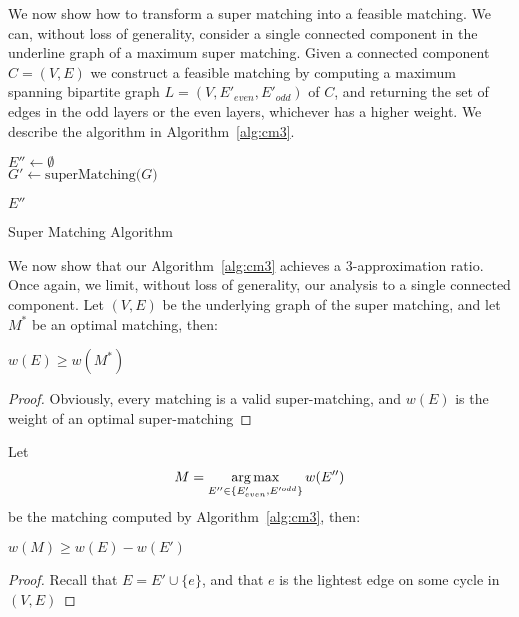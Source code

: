 We now show how to transform a super matching into a feasible matching.
We can, without loss of generality, 
consider a single connected component in the underline graph of a maximum super matching.
Given a connected component $C = (V, E)$ we construct a feasible matching by
computing a maximum spanning bipartite graph $L = (V, E'_{even}, E'_{odd})$ of $C$,
and returning the set of edges in the odd layers or the even layers,
whichever has a higher weight. 
We describe the algorithm in Algorithm~\ref{alg:cm3}.

\begin{algorithm}
\label{alg:cm3}

$E'' \leftarrow \emptyset$								\\
$G' \leftarrow \text{superMatching($G$)}$				\\


\Return $E''$
\caption{Super Matching Algorithm}
\end{algorithm}

We now show that our Algorithm~\ref{alg:cm3} achieves a 3-approximation ratio.
Once again, we limit, without loss of generality, our analysis to a single connected component.
Let $(V, E)$ be the underlying graph of the super matching, 
and let $M^*$ be an optimal matching, then:
\begin{lemma}
\label{lm:super-geq-m^*}
$w(E) \geq w(M^*)$
\end{lemma}

\begin{proof}
Obviously, every matching is a valid super-matching, 
and $w(E)$ is the weight of an optimal super-matching 
\end{proof}

Let
$$ M = \operatorname*{arg\,max}_{E'' \in \{ E'_{even}, E'^{odd} \}}{w(E'')} $$
be the matching computed by Algorithm~\ref{alg:cm3}, then:

\begin{lemma}
\label{lm:more_than_e}
$w(M) \geq w(E) - w(E')$
\end{lemma}

\begin{proof}
Recall that $E = E' \cup \{e\}$, and that $e$ is the lightest edge on some cycle in $(V, E)$ 
\end{proof}

